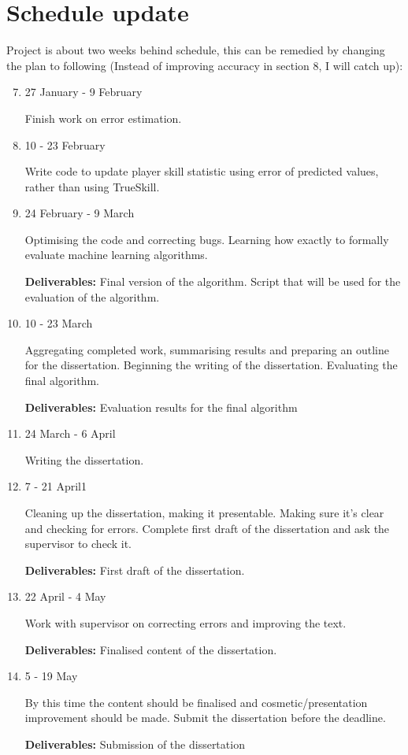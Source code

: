 \documentclass[11pt, a4paper]{article}
\begin{document}
\section*{Schedule update}
Project is about two weeks behind schedule, this can be remedied by changing the plan to following (Instead of improving accuracy in section 8, I will catch up): 
\begin{enumerate}
\setcounter{enumi}{6}
\item
27 January - 9 February

Finish work on error estimation.

\item
10 - 23 February

Write code to update player skill statistic using error of predicted values, rather than using TrueSkill.

\item
24 February - 9 March

Optimising the code and correcting bugs. Learning how exactly to formally evaluate machine learning algorithms.

\textbf{Deliverables:} Final version of the algorithm. Script that will be used for the evaluation of the algorithm.

\item
10 - 23 March

Aggregating completed work, summarising results and preparing an outline for the dissertation. Beginning the writing of the dissertation. Evaluating the final algorithm.

\textbf{Deliverables:} Evaluation results for the final algorithm

\item

24 March - 6 April

Writing the dissertation.

\item

7 - 21 April1

Cleaning up the dissertation, making it presentable. Making sure it's clear and checking for errors. Complete first draft of the dissertation and ask the supervisor to check it.

\textbf{Deliverables:} First draft of the dissertation.

\item
22 April - 4 May

Work with supervisor on correcting errors and improving the text.

\textbf{Deliverables:} Finalised content of the dissertation.

\item
5 - 19 May

By this time the content should be finalised and cosmetic/presentation improvement should be made. Submit the dissertation before the deadline.

\textbf{Deliverables:} Submission of the dissertation
\end{enumerate}
\end{document}

